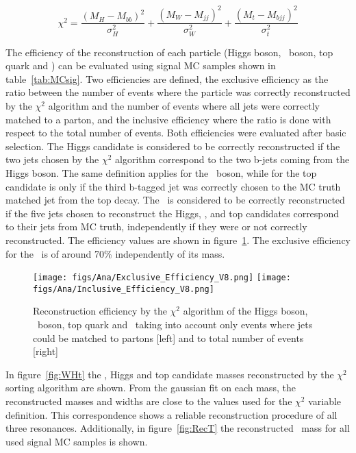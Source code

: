 \begin{equation}
\chi^{2}=\frac{(M_{H}-M_{bb})^{2}}{\sigma_{H}^{2}}+\frac{(M_{W}-M_{jj})^{2}}{\sigma_{W}^{2}}+\frac{(M_{t}-M_{bjj})^{2}}{\sigma_{t}^{2}}
\label{eq:chi2def}
\end{equation}

The efficiency of the reconstruction of each particle (Higgs boson, \W~boson, top quark and \Tp) can be evaluated using signal MC samples shown in table~\ref{tab:MCsig}. Two efficiencies are defined, the exclusive efficiency as the ratio between the number of events where the particle was correctly reconstructed by the $\chi^{2}$ algorithm and the number of events where all jets were correctly matched to a parton, and the inclusive efficiency where the ratio is done with respect to the total number of events. Both efficiencies were evaluated after basic selection. The Higgs candidate is considered to be correctly reconstructed if the two jets chosen by the $\chi^{2}$ algorithm correspond to the two b-jets coming from the Higgs boson. The same definition applies for the \W~boson, while for the top candidate is only if the third b-tagged jet was correctly chosen to the MC truth matched jet from the top decay. The \Tp~is considered to be correctly reconstructed if the five jets chosen to reconstruct the Higgs, \W, and top candidates correspond to their jets from MC truth, independently if they were or not correctly reconstructed. The efficiency values are shown in figure~\ref{fig:RecEff}. The exclusive efficiency for the \Tp~is of around 70\% independently of its mass.

\begin{figure}[!Hhtbp]
  \begin{center}
    \texttt{[image: figs/Ana/Exclusive\_Efficiency\_V8.png]}
    \texttt{[image: figs/Ana/Inclusive\_Efficiency\_V8.png]}
    \caption{Reconstruction efficiency by the $\chi^{2}$ algorithm of the Higgs boson, \W~boson, top quark and \Tp~taking into account only events where jets could be matched to partons [left] and to total number of events [right]}
    \label{fig:RecEff}
  \end{center}
\end{figure}

In figure~\ref{fig:WHt} the \W, Higgs and top candidate masses reconstructed by the $\chi^{2}$ sorting algorithm are shown. From the gaussian fit on each mass, the reconstructed masses and widths are close to the values used for the $\chi^{2}$ variable definition. This correspondence shows a reliable reconstruction procedure of all three resonances. Additionally, in figure~\ref{fig:RecT} the reconstructed \Tp~mass for all used signal MC samples is shown.

